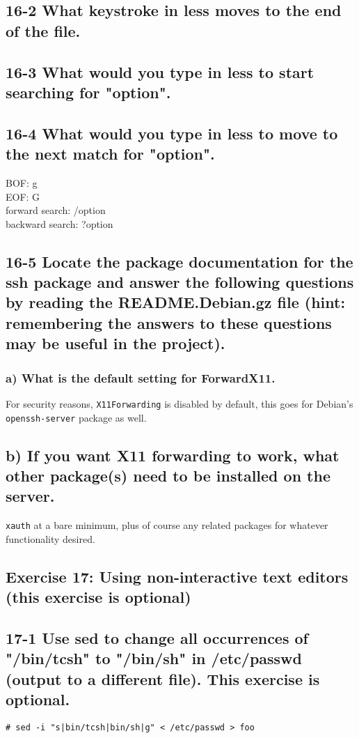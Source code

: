 \subsection{16-2 What keystroke in less moves to the end of the file.}
\subsection{16-3 What would you type in less to start searching for "option".}
\subsection{16-4 What would you type in less to move to the next match for "option".}
BOF: g\\
EOF: G\\
forward search: /option\\
backward search: ?option

\subsection{16-5 Locate the package documentation for the ssh package and answer the following questions by reading the README.Debian.gz file (hint: remembering the answers to these questions may be useful in the project).}

\subsubsection{a) What is the default setting for ForwardX11.}
For security reasons, \verb=X11Forwarding= is disabled by default, this goes for Debian's \verb=openssh-server= package as well.

\subsection{b) If you want X11 forwarding to work, what other package(s) need to be installed on the server.}
\verb=xauth= at a bare minimum, plus of course any related packages for whatever functionality desired.



\subsection{Exercise 17: Using non-interactive text editors (this exercise is optional)}
\subsection{17-1 Use sed to change all occurrences of "/bin/tcsh" to "/bin/sh" in /etc/passwd (output to a different file). This exercise is optional.}
\verb=# sed -i "s|bin/tcsh|bin/sh|g" < /etc/passwd > foo=

